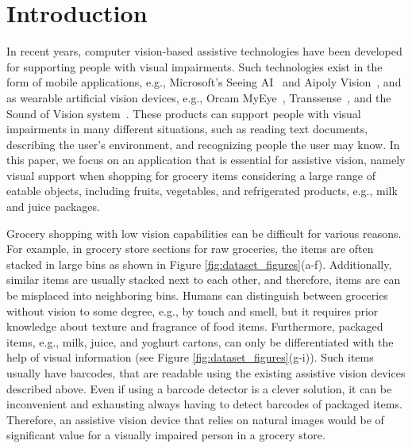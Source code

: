 \section{Introduction}
\label{paperB:sec:introduction}

In recent years, computer vision-based assistive technologies have been developed for supporting people with visual impairments.
Such technologies exist in the form of mobile applications, e.g., Microsoft's Seeing AI~ and Aipoly Vision~, and as wearable artificial vision devices, e.g., Orcam MyEye~, Transsense~, and the Sound of Vision system~. These products can support people with visual impairments in many different situations, such as reading text documents, describing the user's environment, and recognizing people the user may know. 
In this paper, we focus on an application that is essential for assistive vision, namely visual support when shopping for grocery items considering a large range of eatable objects, including fruits, vegetables, and refrigerated products, e.g., milk and juice packages.

Grocery shopping with low vision capabilities can be difficult for various reasons. For example, in grocery store sections for raw groceries, the items are often stacked in large bins as shown in Figure \ref{fig:dataset_figures}(a-f). Additionally, similar items are usually stacked next to each other, and therefore, items are can be misplaced into neighboring bins. Humans can distinguish between groceries without vision to some degree, e.g., by touch and smell, but it requires prior knowledge about texture and fragrance of food items. 
Furthermore, packaged items, e.g., milk, juice, and yoghurt cartons, can only be differentiated with the help of visual information (see Figure \ref{fig:dataset_figures}(g-i)). 
Such items usually have barcodes, that are readable using the existing assistive vision devices described above. 
Even if using a barcode detector is a clever solution, it can be inconvenient and exhausting always having to detect barcodes of packaged items.
Therefore, an assistive vision device that relies on natural images would be of significant value for a visually impaired person in a grocery store. 

